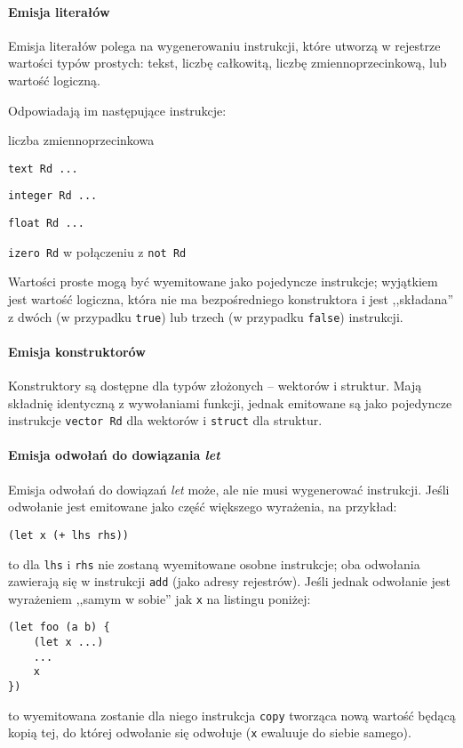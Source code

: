 \paragraph{Emisja literałów}

Emisja literałów polega na wygenerowaniu instrukcji, które utworzą w rejestrze
wartości typów prostych: tekst, liczbę całkowitą, liczbę zmiennoprzecinkową, lub
wartość logiczną.

Odpowiadają im następujące instrukcje:

\begin{labeling}{liczba zmiennoprzecinkowa}
\item[tekst] \texttt{text Rd ...}
\item[liczba całkowita] \texttt{integer Rd ...}
\item[liczba zmiennoprzecinkowa] \texttt{float Rd ...}
\item[wartość logiczna] \texttt{izero Rd} w połączeniu z \texttt{not Rd}
\end{labeling}

Wartości proste mogą być wyemitowane jako pojedyncze instrukcje; wyjątkiem jest
wartość logiczna, która nie ma bezpośredniego konstruktora i jest ,,składana'' z
dwóch (w przypadku \texttt{true}) lub trzech (w przypadku \texttt{false})
instrukcji.

\paragraph{Emisja konstruktorów}

Konstruktory są dostępne dla typów złożonych -- wektorów i struktur. Mają
składnię identyczną z wywołaniami funkcji, jednak emitowane są jako pojedyncze
instrukcje \texttt{vector Rd} dla wektorów i \texttt{struct} dla struktur.

\paragraph{Emisja odwołań do dowiązania \emph{let}}

Emisja odwołań do dowiązań \emph{let} może, ale nie musi wygenerować instrukcji.
Jeśli odwołanie jest emitowane jako część większego wyrażenia, na przykład:
\begin{lstlisting}
(let x (+ lhs rhs))
\end{lstlisting}
to dla \texttt{lhs} i \texttt{rhs} nie zostaną wyemitowane osobne instrukcje;
oba odwołania zawierają się w instrukcji \texttt{add} (jako adresy rejestrów).
Jeśli jednak odwołanie jest wyrażeniem ,,samym w sobie'' jak \texttt{x} na
listingu poniżej:
\begin{lstlisting}
(let foo (a b) {
    (let x ...)
    ...
    x
})
\end{lstlisting}
to wyemitowana zostanie dla niego instrukcja \texttt{copy} tworząca nową wartość
będącą kopią tej, do której odwołanie się odwołuje (\texttt{x} ewaluuje do
siebie samego).

